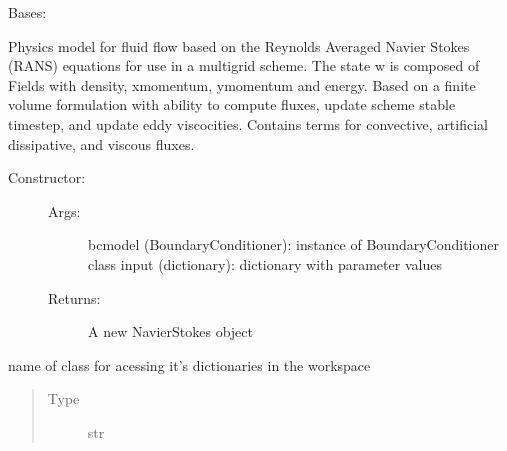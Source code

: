 \documentclass[letterpaper,10pt,english]{sphinxmanual}
\begin{document}
\begin{fulllineitems}
\label{\detokenize{autoapi/NavierStokes/index:NavierStokes.NavierStokes}}
\sphinxAtStartPar
Bases: 

\sphinxAtStartPar
Physics model for fluid flow based on the Reynolds Averaged Navier Stokes (RANS) equations
for use in a multigrid scheme. The state w is composed of Fields with density, x\sphinxhyphen{}momentum, y\sphinxhyphen{}momentum and energy.
Based on a finite volume formulation with ability to compute fluxes, update scheme stable timestep,
and update eddy viscocities. Contains terms for convective, artificial dissipative, and viscous fluxes.
\begin{description}
\item[{Constructor:}] \leavevmode\begin{description}
\item[{Args:}] \leavevmode
\sphinxAtStartPar
bcmodel (BoundaryConditioner): instance of BoundaryConditioner class
input (dictionary): dictionary with parameter values

\item[{Returns:}] \leavevmode
\sphinxAtStartPar
A new NavierStokes object

\end{description}

\end{description}

\begin{fulllineitems}
\label{\detokenize{autoapi/NavierStokes/index:NavierStokes.NavierStokes.className}}
\sphinxAtStartPar
name of class for acessing it’s dictionaries in the workspace
\begin{quote}\begin{description}
\item[{Type}] \leavevmode
\sphinxAtStartPar
str

\end{description}\end{quote}

\end{fulllineitems}


\end{fulllineitems}
\end{document}

